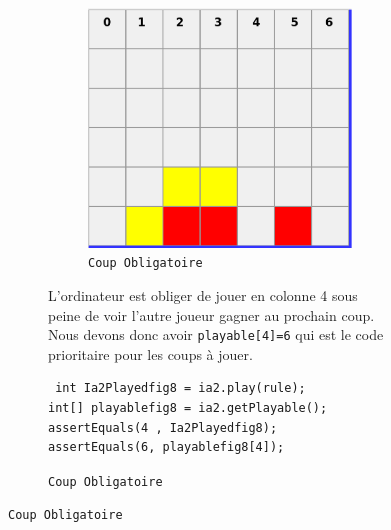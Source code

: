\begin{figure}[H]
\begin{figure}[H]
\begin{figure}[H]
\begin{center}
  \includegraphics[scale=0.2]{playable6}
  \caption{\texttt{Coup Obligatoire}}
\end{center}
\end{figure}

L'ordinateur est obliger de jouer en colonne 4 sous peine de voir l'autre joueur gagner au prochain coup.
Nous devons donc avoir \texttt{playable[4]=6} qui est le code prioritaire pour les coups à jouer. 

\begin{verbatim}
 int Ia2Playedfig8 = ia2.play(rule);
int[] playablefig8 = ia2.getPlayable();
assertEquals(4 , Ia2Playedfig8);
assertEquals(6, playablefig8[4]);
\end{verbatim}



\end{figure}
\end{figure}
